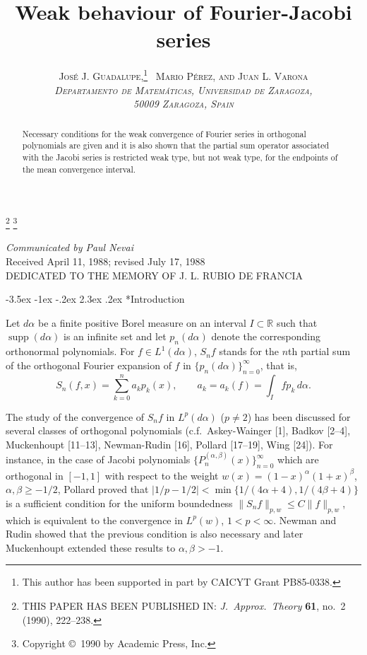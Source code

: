 \documentclass[10pt,a4paper]{article}
\title{\sffamily Weak behaviour of Fourier-Jacobi series}
\author{\scshape Jos\'{e} J. Guadalupe,\footnote{This author has been
supported in part by CAICYT Grant PB85-0338.}
\ Mario P\'{e}rez, and Juan L. Varona\\[5pt]
\textit{Departamento de Matem\'{a}ticas,}
\textit{Universidad de Zaragoza,}\\
\textit{50009 Zaragoza, Spain}
}
\date{}
\makeatletter
\newcommand{\R}{\mathbb{R}}
\newcommand{\supp}{\operatorname{supp}}
\renewcommand\section{\@startsection {section}{1}{\z@}%
                                   {-3.5ex \@plus -1ex \@minus -.2ex}%
                                   {2.3ex \@plus.2ex}%
                                   {\centering \normalfont\large\scshape}}
\theoremstyle{plain}
\theoremstyle{remark}
\makeatother
\begin{document}

\maketitle
\renewcommand\thefootnote{}%
\renewcommand\footnotemark{}%
\footnote{THIS PAPER HAS BEEN PUBLISHED IN:
\textit{J.\ Approx.\ Theory}
\textbf{61}, no.~2 (1990), 222--238.}%
\footnote{Copyright \copyright\ 1990 by Academic Press, Inc.}%

\begin{center}
\vspace*{-24pt}
\textit{Communicated by Paul Nevai}\\[4pt]
\textrm{Received April 11, 1988; revised July 17, 1988}\\[12pt]
DEDICATED TO THE MEMORY OF J. L. RUBIO DE FRANCIA
\end{center}

\begin{abstract}
Necessary conditions for the weak convergence of
Fourier series in orthogonal polynomials are given and it is
also shown that the partial sum operator associated with the
Jacobi series is restricted weak type, but not weak type, for
the endpoints of the mean convergence interval.
\end{abstract}

\section*{Introduction}

Let $d\alpha$ be a finite positive Borel measure on an interval
$I \subset \R$ such that $\supp(d\alpha)$ is an infinite set
and let $p_{n}(d\alpha)$ denote the corresponding orthonormal
polynomials. For $f \in L^{1}(d\alpha)$, $S_{n}f$ stands for
the $n$th partial sum of the orthogonal Fourier expansion of $f$
in $\{p_{n}(d\alpha)\}_{n=0}^{\infty}$, that is,
$$
S_{n}(f,x) = \sum_{k=0}^{n} a_{k}p_{k}(x),
\qquad a_{k} = a_{k}(f) = \int_{I} fp_{k}\,d\alpha.
$$

The study of the convergence of $S_{n}f$ in $L^{p}(d\alpha)$
($p \neq 2$) has been discussed for several classes of orthogonal
polynomials (c.f.\ Askey-Wainger [1], Badkov [2--4], Muckenhoupt
[11--13], Newman-Rudin [16], Pollard [17--19], Wing [24]). For
instance, in the case of Jacobi polynomials
$\{P_{n}^{(\alpha,\beta)}(x)\}_{n=0}^{\infty}$
which are orthogonal in $[-1,1]$ with respect to the weight
$w(x) = (1-x)^{\alpha}(1+x)^{\beta}$, $\alpha, \beta \geq -1/2$,
Pollard proved that $|1/p-1/2| < \min\{1/(4\alpha+4),1/(4\beta+4)\}$
is a sufficient condition for the uniform boundedness
$\|S_{n}f\|_{p,w} \leq C\|f\|_{p,w}$,
which is equivalent to the convergence in $L^{p}(w)$, $1 < p < \infty$.
Newman and Rudin showed that the previous
condition is also necessary and later Muckenhoupt extended these
results to $\alpha, \beta > -1$.
\end{document}
